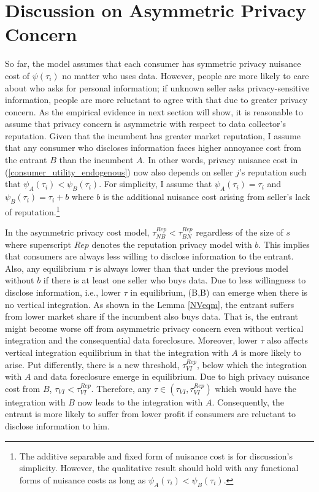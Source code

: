 \documentclass[12pt]{article}
\begin{document}
\section{Discussion on Asymmetric Privacy Concern}
So far, the model assumes that each consumer has symmetric privacy nuisance cost of $\psi(\tau_i)$ no matter who uses data. However, people are more likely to care about who asks for personal information; if unknown seller asks privacy-sensitive information, people are more reluctant to agree with that due to greater privacy concern. As the empirical evidence in next section will show, it is reasonable to assume that privacy concern is asymmetric with respect to data collector's reputation. Given that the incumbent has greater market reputation, I assume that any consumer who discloses information faces higher annoyance cost from the entrant $B$ than the incumbent $A$.  In other words, privacy nuisance cost in (\ref{consumer_utility_endogenous}) now also depends on seller $j$'s reputation such that $\psi_A(\tau_i)<\psi_B(\tau_i)$. For simplicity, I assume that $\psi_A(\tau_i)=\tau_i$ and $\psi_B(\tau_i)=\tau_i+b$ where $b$ is the additional nuisance cost arising from seller's lack of reputation.\footnote{The additive separable and fixed form of nuisance cost is for discussion's simplicity. However, the qualitative result should hold with any functional forms of nuisance costs as long as $\psi_A(\tau_i)<\psi_B(\tau_i)$.} 

In the asymmetric privacy cost model, $\tau_{NB}^{Rep}<\tau_{BN}^{Rep}$ regardless of the size of $s$ where superscript $Rep$ denotes the reputation privacy model with $b$. This implies that consumers are always less willing to disclose information to the entrant. Also, any equilibrium $\tau$ is always lower than that under the previous model without $b$ if there is at least one seller who buys data. Due to less willingness to disclose information, i.e., lower $\tau$ in equilibrium, (B,B) can emerge when there is no vertical integration. As shown in the Lemma \ref{NVeqm}, the entrant suffers from lower market share if the incumbent also buys data. That is, the entrant might become worse off from asymmetric privacy concern even without vertical integration and the consequential data foreclosure. Moreover, lower $\tau$ also affects vertical integration equilibrium in that the integration with $A$ is more likely to arise. Put differently, there is a new threshold,  $\tau_{VI}^{Rep}$, below which the integration with $A$ and data foreclosure emerge in equilibrium. Due to high privacy nuisance cost from $B$, $\tau_{VI}<\tau_{VI}^{Rep}$. Therefore, any $\tau \in (\tau_{VI},\tau_{VI}^{Rep})$ which would have the integration with $B$ now leads to the integration with $A$. Consequently, the entrant is more likely to suffer from lower profit if consumers are reluctant to disclose information to him. 
\end{document}
